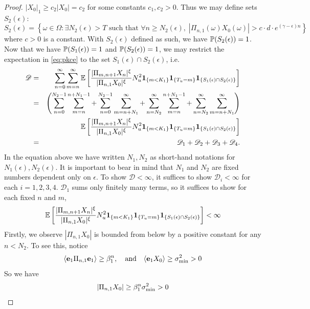 \begin{proof}
  $|X_0|_1 \geq c_2 |X_0| = c_2$
  for some constants $c_1, c_2 > 0$. Thus we may define sets
  $S_2(\epsilon)$:
  \[
  S_2(\epsilon) = \left\{
    \omega \in \Omega:
    \exists N_2(\epsilon) > T \text{ such that }
    \forall n \geq N_2(\epsilon),\;
    |\Pi_{n, 1}(\omega) X_0(\omega)| > c \cdot d \cdot e^{(\gamma - \epsilon) n}
  \right\}
  \]
  where $c > 0$ is a constant. With $S_2(\epsilon)$ defined as such,
  we have $\P(S_2(\epsilon)) = 1$. Now that we have
  $\P(S_1(\epsilon)) = 1$ and $\P(S_2(\epsilon)) = 1$, we may
  restrict the expectation in \eqref{eq:pkce} to the set
  $S_1(\epsilon) \cap S_2(\epsilon)$, i.e.
  \begin{eqnarray*}
    \mathscr D
    &=&
    \sum_{n = 0}^\infty \sum_{m = n}^\infty
    \E \left[
            {
        |\Pi_{m, n+1} X_n |^{\xi}
        \over
        |\Pi_{n, 1} X_0 |^{\xi}        
      }
      N_u^2
      \1{m < K_1} \1{T_u = m} \1{S_1(\epsilon) \cap S_2(\epsilon)} 
      \right] \\
    &=&
    \left(
    \sum_{n = 0}^{N_2 - 1} \sum_{m = n}^{n + N_1 - 1}
    +
    \sum_{n = 0}^{N_2 - 1} \sum_{m = n + N_1}^\infty
    +
    \sum_{n = N_2}^{\infty} \sum_{m = n}^{n + N_1 - 1}
    +
    \sum_{n = N_2}^{\infty} \sum_{m = n + N_1}^\infty
    \right) \nonumber \\
    &&
    \E \left[
            {
        |\Pi_{m, n+1} X_n |^{\xi}
        \over
        |\Pi_{n, 1} X_0 |^{\xi}        
      }
      N_u^2
      \1{m < K_1} \1{T_u = m} \1{S_1(\epsilon) \cap S_2(\epsilon)} 
      \right] \nonumber \\
    &=& \mathscr D_1 + \mathscr D_2 + \mathscr D_3 + \mathscr D_4.
  \end{eqnarray*}
  In the equation above we have written $N_1, N_2$
  as short-hand notations for $N_1(\epsilon), N_2(\epsilon)$. It is
  important to bear in mind that $N_1$ and $N_2$ are fixed numbers
  dependent only on $\epsilon$.
  To show $\mathscr D < \infty$, it suffices to show
  $\mathscr D_i < \infty$ for each $i = 1, 2, 3, 4$.
  $\mathscr D_1$ sums only finitely many terms, so it
  suffices to show for each fixed $n$ and $m$,
  \begin{equation}
    \label{eq:ceh}
    \E \left[
      {
        |\Pi_{m, n+1} X_n |^{\xi}
        \over
        |\Pi_{n, 1} X_0 |^{\xi}        
      }
      N_u^2
      \1{m < K_1} \1{T_u = m} \1{S_1(\epsilon) \cap S_2(\epsilon)} 
      \right] < \infty
  \end{equation}
  Firstly, we observe $|\Pi_{n, 1} X_0 |$ is bounded from below by a positive
  constant for any $n < N_2$. To see this, notice
  \[
  \inn{\vec e_1 \Pi_{n, 1} \vec e_1} \geq \beta_1^n, \quad
  \text{and} \quad
  \inn{\vec e_1 X_0} \geq \sigma_\m^2 > 0
  \]
  So we have
  \[
  |\Pi_{n, 1} X_0 | \geq \beta_1^n \sigma_\m^2 > 0
  \]
  

\end{proof}
